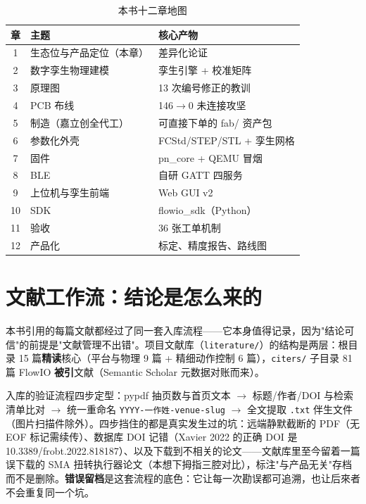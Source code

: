 \begin{table}[htbp]
  \centering
  \caption{本书十二章地图}
  \label{tab:intro-map}
  \begin{tabular}{clp{6.4cm}}
    \toprule
    章 & 主题 & 核心产物 \\
    \midrule
    1 & 生态位与产品定位（本章） & 差异化论证 \\
    2 & 数字孪生物理建模 & 孪生引擎 + 校准矩阵 \\
    3 & 原理图 & 13 次编号修正的教训 \\
    4 & PCB 布线 & 146$\to$0 未连接攻坚 \\
    5 & 制造（嘉立创全代工） & 可直接下单的 fab/ 资产包 \\
    6 & 参数化外壳 & FCStd/STEP/STL + 孪生网格 \\
    7 & 固件 & pn\_core + QEMU 冒烟 \\
    8 & BLE & 自研 GATT 四服务 \\
    9 & 上位机与孪生前端 & Web GUI v2 \\
    10 & SDK & flowio\_sdk（Python） \\
    11 & 验收 & 36 张工单机制 \\
    12 & 产品化 & 标定、精度报告、路线图 \\
    \bottomrule
  \end{tabular}
\end{table}

\section{文献工作流：结论是怎么来的}
\label{sec:intro-litflow}

本书引用的每篇文献都经过了同一套入库流程——它本身值得记录，因为"结论可信"的前提是"文献管理不出错"。项目文献库（\texttt{literature/}）的结构是两层：根目录 15 篇\textbf{精读}核心（平台与物理 9 篇 + 精细动作控制 6 篇），\texttt{citers/} 子目录 81 篇 FlowIO \textbf{被引}文献（Semantic Scholar 元数据对账而来）。

入库的验证流程四步定型：pypdf 抽页数与首页文本 $\to$ 标题/作者/DOI 与检索清单比对 $\to$ 统一重命名 \texttt{YYYY-一作姓-venue-slug} $\to$ 全文提取 \texttt{.txt} 伴生文件（图片扫描件除外）。四步挡住的都是真实发生过的坑：远端静默截断的 PDF（无 EOF 标记需续传）、数据库 DOI 记错（Xavier 2022 的正确 DOI 是 10.3389/frobt.2022.818187）、以及下载到不相关的论文——文献库里至今留着一篇误下载的 SMA 扭转执行器论文（本想下拇指三腔对比），标注"与产品无关"存档而不是删除。\textbf{错误留档}是这套流程的底色：它让每一次勘误都可追溯，也让后來者不会重复同一个坑。

